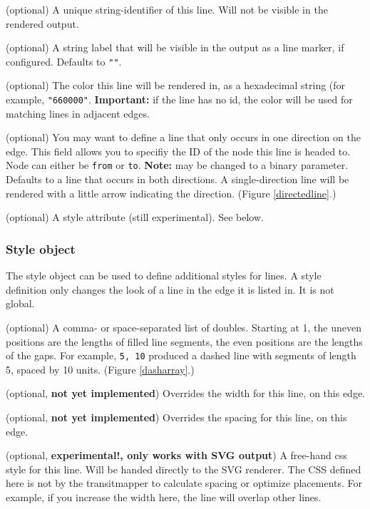\documentclass[10pt,a4paper]{article}
\begin{document}
\begin{description}[align=right]
	\item[\texttt{id}] (optional) A unique string-identifier of this line. Will not be visible in the rendered output.
	\item[\texttt{label}] (optional) A string label that will be visible in the output as a line marker, if configured. Defaults to \texttt{""}.
	\item[\texttt{color}] (optional) The color this line will be rendered in, as a hexadecimal string (for example, \texttt{"660000"}. \textbf{Important:} if the line has no id, the color will be used for matching lines in adjacent edges.
	\item[\texttt{direction}] (optional) You may want to define a line that only occurs in one direction on the edge. This field allows you to specifiy the ID of the node this line is headed to. Node can either be \texttt{from} or \texttt{to}. \textbf{Note:} may be changed to a binary parameter. Defaults to a line that occurs in both directions. A single-direction line will be rendered with a little arrow indicating the direction. (Figure \ref{directedline}.)
	\item[\texttt{style}] (optional) A style attribute (still experimental). See below.
\end{description}

\subsubsection{Style object}

The style object can be used to define additional styles for lines. A style definition only changes the look of a line in the edge it is listed in. It is not global.

\begin{description}[align=right]
	\item[\texttt{dash-array}] (optional) A comma- or space-separated list of doubles. Starting at 1, the uneven positions are the lengths of filled line segments, the even positions are the lengths of the gaps. For example, \texttt{5, 10} produced a dashed line with segments of length 5, spaced by 10 units. (Figure \ref{dasharray}.)
	\item[\texttt{line-width}] (optional, \textbf{not yet implemented}) Overrides the width for this line, on this edge.
	\item[\texttt{line-spacing}] (optional, \textbf{not yet implemented}) Overrides the spacing for this line, on this edge.
	\item[\texttt{css}] (optional, \textbf{experimental!, only works with SVG output}) A free-hand css style for this line. Will be handed directly to the SVG renderer. The CSS defined here is not by the transitmapper to calculate spacing or optimize placements. For example, if you increase the width here, the line will overlap other lines.
\end{description}
\end{document}
